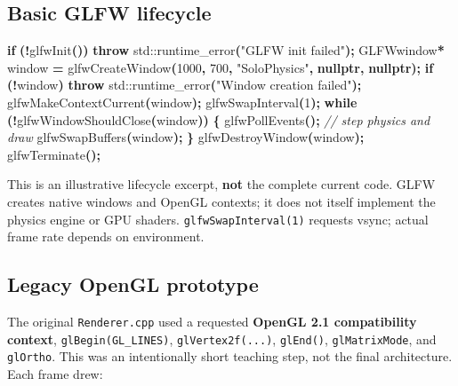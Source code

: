 \documentclass[
  10pt,
  a4paper,
]{article}
\newenvironment{Shaded}{\begin{snugshade}}{\end{snugshade}}
\newcommand{\BuiltInTok}[1]{#1}
\newcommand{\CommentTok}[1]{\textcolor[rgb]{0.56,0.35,0.01}{\textit{#1}}}
\newcommand{\ControlFlowTok}[1]{\textcolor[rgb]{0.13,0.29,0.53}{\textbf{#1}}}
\newcommand{\DecValTok}[1]{\textcolor[rgb]{0.00,0.00,0.81}{#1}}
\newcommand{\KeywordTok}[1]{\textcolor[rgb]{0.13,0.29,0.53}{\textbf{#1}}}
\newcommand{\NormalTok}[1]{#1}
\newcommand{\OperatorTok}[1]{\textcolor[rgb]{0.81,0.36,0.00}{\textbf{#1}}}
\newcommand{\StringTok}[1]{\textcolor[rgb]{0.31,0.60,0.02}{#1}}
\begin{document}
\subsection{Basic GLFW lifecycle}\label{basic-glfw-lifecycle}

\begin{Shaded}
\begin{Highlighting}[]
\ControlFlowTok{if} \OperatorTok{(!}\NormalTok{glfwInit}\OperatorTok{())} \ControlFlowTok{throw} \BuiltInTok{std::}\NormalTok{runtime\_error}\OperatorTok{(}\StringTok{"GLFW init failed"}\OperatorTok{);}
\NormalTok{GLFWwindow}\OperatorTok{*}\NormalTok{ window }\OperatorTok{=}\NormalTok{ glfwCreateWindow}\OperatorTok{(}\DecValTok{1000}\OperatorTok{,} \DecValTok{700}\OperatorTok{,} \StringTok{"SoloPhysics"}\OperatorTok{,} \KeywordTok{nullptr}\OperatorTok{,} \KeywordTok{nullptr}\OperatorTok{);}
\ControlFlowTok{if} \OperatorTok{(!}\NormalTok{window}\OperatorTok{)} \ControlFlowTok{throw} \BuiltInTok{std::}\NormalTok{runtime\_error}\OperatorTok{(}\StringTok{"Window creation failed"}\OperatorTok{);}
\NormalTok{glfwMakeContextCurrent}\OperatorTok{(}\NormalTok{window}\OperatorTok{);}
\NormalTok{glfwSwapInterval}\OperatorTok{(}\DecValTok{1}\OperatorTok{);}
\ControlFlowTok{while} \OperatorTok{(!}\NormalTok{glfwWindowShouldClose}\OperatorTok{(}\NormalTok{window}\OperatorTok{))} \OperatorTok{\{}
\NormalTok{    glfwPollEvents}\OperatorTok{();}
    \CommentTok{// step physics and draw}
\NormalTok{    glfwSwapBuffers}\OperatorTok{(}\NormalTok{window}\OperatorTok{);}
\OperatorTok{\}}
\NormalTok{glfwDestroyWindow}\OperatorTok{(}\NormalTok{window}\OperatorTok{);}
\NormalTok{glfwTerminate}\OperatorTok{();}
\end{Highlighting}
\end{Shaded}

This is an illustrative lifecycle excerpt, \textbf{not} the complete
current code. GLFW creates native windows and OpenGL contexts; it does
not itself implement the physics engine or GPU shaders.
\texttt{glfwSwapInterval(1)} requests vsync; actual frame rate depends
on environment.

\subsection{Legacy OpenGL prototype}\label{legacy-opengl-prototype}

The original \texttt{Renderer.cpp} used a requested \textbf{OpenGL 2.1
compatibility context}, \texttt{glBegin(GL\_LINES)},
\texttt{glVertex2f(...)}, \texttt{glEnd()}, \texttt{glMatrixMode}, and
\texttt{glOrtho}. This was an intentionally short teaching step, not the
final architecture. Each frame drew:
\end{document}
